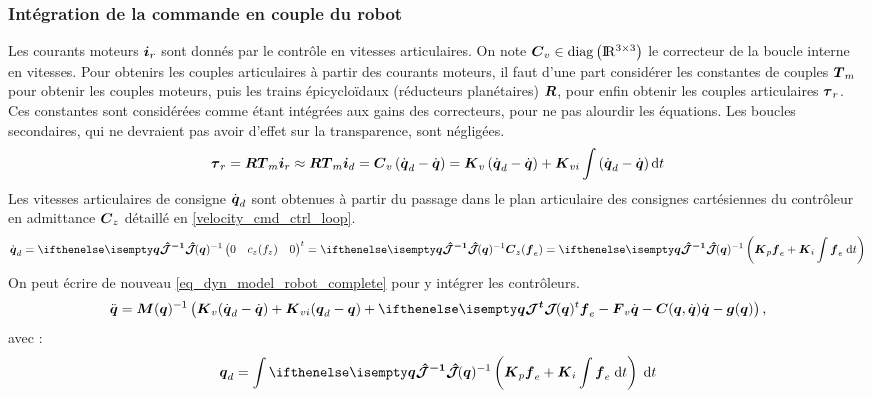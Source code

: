 \documentclass[12pt, a4paper]{article} %
\numberwithin{equation}{section}
\begin{document}
	\subsubsection{Intégration de la commande en couple du robot}
	
	Les courants moteurs $ \vect{i}_r $ sont donnés par le contrôle en vitesses articulaires. On note $ \matr{C}_v \in \mathrm{diag} \left( \R^{3\times3} \right) $ le correcteur de la boucle interne en vitesses. %
	Pour obtenirs les couples articulaires à partir des courants moteurs, il faut d'une part considérer les constantes de couples $ \matr{T}_m $ pour obtenir les couples moteurs, puis  les trains épicycloïdaux (réducteurs planétaires) $ \matr{R} $, pour enfin obtenir les couples articulaires $ \vect{\tau}_r $. Ces constantes sont considérées comme étant intégrées aux gains des correcteurs, pour ne pas alourdir les équations.
	Les boucles secondaires, qui ne devraient pas avoir d'effet sur la transparence, sont négligées.	
	\begin{equation} \label{torque_cmd_ctrl_loop}
	\vect{\tau}_r = \matr{R} \matr{T}_m \vect{i}_r \approx \matr{R} \matr{T}_m \vect{i}_d =  \matr{C}_v \left( \dot{\vect{q}}_d - \dot{\vect{q}} \right) = \matr{K}_v \left( \dot{\vect{q}}_d - \dot{\vect{q}} \right) + \matr{K}_{vi} \int \left( \dot{\vect{q}}_d - \dot{\vect{q}} \right) \mathrm{d}t
	\end{equation}
	Les vitesses articulaires de consigne $ \dot{\vect{q}}_d $ sont obtenues à partir du passage dans le plan articulaire des consignes cartésiennes du contrôleur en admittance $ \matr{C}_z $ détaillé en \cref{velocity_cmd_ctrl_loop}.
	\begin{equation} \label{velocity_cmd_ctrl_loop}
	\dot{\vect{q}}_d = \jacobianHat{\vect{q}}{}{-1} \begin{pmatrix} 0 & c_z (f_z) & 0 \end{pmatrix}^{t} = \jacobianHat{\vect{q}}{}{-1} \matr{C}_z (\vect{f}_e) = \jacobianHat{\vect{q}}{}{-1}\left( \matr{K}_p \vect{f}_e + \matr{K}_i \int \vect{f}_e \; \mathrm{d}t \right)
	\end{equation}
	On peut écrire de nouveau \cref{eq_dyn_model_robot_complete} pour y intégrer les contrôleurs.
	\begin{equation} \label{eq_dyn_model_robot_complete_ctrl}
	\ddot{\vect{q}} = \matr{M}(\vect{q})^{-1} \left( \matr{K}_v (\dot{\vect{q}}_d - \dot{\vect{q}}) + \matr{K}_{vi} (\vect{q}_d - \vect{q}) + \jacobian{\vect{q}
	}{}{t} \vect{f}_{e} - \matr{F}_v \dot{\vect{q}} - \matr{C}(\vect{q}, \dot{\vect{q}}) \dot{\vect{q}} - \vect{g}(\vect{q}) \right) \text{,}
	\end{equation}
	avec :
	\begin{equation} \label{integral_velocity_cmd_ctrl_loop}
	\vect{q}_d = \int \jacobianHat{\vect{q}}{}{-1}\left( \matr{K}_p \vect{f}_e + \matr{K}_i \int \vect{f}_e \; \mathrm{d}t \right) \; \mathrm{d}t
	\end{equation}
\end{document}

